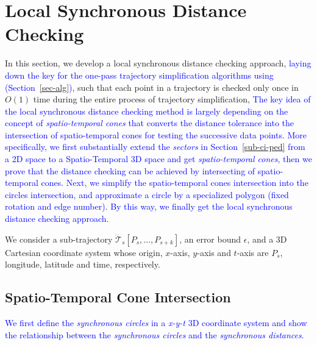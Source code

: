 \section{Local Synchronous Distance Checking}
\label{sec-localcheck}


In this section, we develop a local synchronous distance checking approach, \textcolor{blue}{laying down the key for the one-pass trajectory simplification algorithms using \sed (Section~\ref{sec-alg})}, such that each point in a trajectory is checked only once in $O(1)$ time during the entire process of trajectory simplification,
\textcolor{blue}{The key idea of the local synchronous distance checking method is largely depending on the concept of \emph{spatio-temporal cones} that converts the \sed distance tolerance into the intersection of spatio-temporal cones for testing the successive data points.}
\textcolor{blue}{More specifically, we first substantially extend the \textit{sectors} in Section~\ref{sub-ci-ped} from a 2D space to a Spatio-Temporal 3D space and get \emph{spatio-temporal cones}, then we prove that the \sed distance checking can be achieved by intersecting of spatio-temporal cones.}
\textcolor{blue}{Next, we simplify the spatio-temporal cones intersection into the circles intersection, and  approximate a circle by a specialized polygon (fixed rotation and edge number). By this way, we finally get the local synchronous distance checking approach.}


We consider a sub-trajectory $\dddot{\mathcal{T}}_s[P_s, \ldots, P_{s+k}]$, an error bound $\epsilon$, and a 3D Cartesian coordinate system whose origin, $x$-axis, $y$-axis and $t$-axis  are $P_s$, longitude, latitude and time, respectively.

\subsection{Spatio-Temporal Cone Intersection}

\textcolor{blue}{We first define the \textit{synchronous circles} in a \emph{x-y-t} 3D coordinate system and show the relationship between the \textit{synchronous circles} and the \textit{synchronous distances}.}

